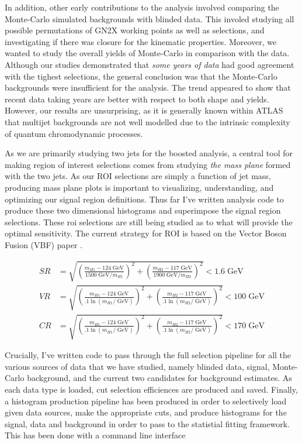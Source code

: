 \documentclass[12pt]{article}
\newcommand{\un}[1]{\;\text{#1}}
\begin{document}
In addition, other early contributions to the analysis involved comparing the
Monte-Carlo simulated backgrounds with blinded data. This involed studying all
possible permutations of GN2X working points as well as selections, and
investigating if there was closure for the kinematic properties. Moreover, we
wanted to study the overall yields of Monte-Carlo in comparison with the data. Although our
studies demonstrated that \textit{some years of data} had good agreement with
the tighest selections, the general conclusion was that the Monte-Carlo
backgrounds were insufficient for the analysis. The trend appeared to show that
recent data taking years are better with respect to both shape and yields.
However, our results are unsurprising, as it is generally known within ATLAS
that multijet backgrounds are not well modelled due to the intrinsic
complexity of quantum chromodynamic processes.

As we are primarily studying two jets for the boosted analysis, a central tool
for making region of interest selections comes from studying \textit{the mass
plane} formed with the two jets. As our ROI selections are simply a function of
jet mass, producing mass plane plots is important to visualizing, understanding,
and optimizing our signal region definitions. Thus far I've written analysis
code to produce these two dimensional histograms and superimpose the signal
region selections. These roi selections are still being studied as to what will
provide the optimal sensitivity. The current strategy for ROI is based on the
Vector Boson Fusion (VBF) paper \cite{atlas_hhbbbb_vbf}.

\begin{align}
    SR &= \sqrt{\left( \frac{m_{H1}-124\;\text{GeV}}{1500\;\text{GeV}/m_{H1}}
    \right)^2 + \left( \frac{m_{H2}-117\;\text{GeV}}{1900\;\text{GeV}/m_{H2}}
    \right)^2} < 1.6 \un{GeV} \\
    VR &= \sqrt{\left( \frac{m_{H1}-124\;\text{GeV}}{.1\ln(m_{H1}/\;\text{GeV})}
    \right)^2 + \left( \frac{m_{H2}-117\;\text{GeV}}{.1\ln(m_{H2}/\;\text{GeV})}
    \right)^2} < 100 \un{GeV} \\
    CR &= \sqrt{\left( \frac{m_{H1}-124\;\text{GeV}}{.1\ln(m_{H1}/\;\text{GeV})}
    \right)^2 + \left( \frac{m_{H2}-117\;\text{GeV}}{.1\ln(m_{H2}/\;\text{GeV})}
    \right)^2} < 170 \un{GeV}
\end{align}

Crucially, I've written code to pass through the full selection pipeline for all
the various sources of data that we have studied, namely blinded data, signal,
Monte-Carlo background, and the current two candidates for background estimates.
As each data type is loaded, cut selection efficiences are produced and saved.
Finally, a histogram production pipeline has been produced in order to
selectively load given data sources, make the appropriate cuts, and produce
histograms for the signal, data and background in order to pass to the
statistial fitting framework. This has been done with a command line interface
\end{document}
